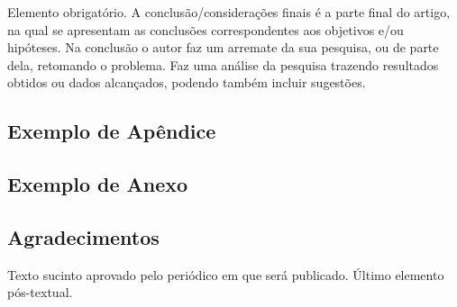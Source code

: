 \documentclass[
	article,			%
	12pt,				%
	oneside,			%
	a4paper,			%
	english,			%
	brazil,				%
	sumario=tradicional
]{abntex2}
\begin{document}
Elemento obrigatório. A conclusão/considerações finais é a parte final do artigo, na qual se apresentam as conclusões correspondentes aos objetivos e/ou hipóteses. Na conclusão o autor faz um arremate da sua pesquisa, ou de parte dela, retomando o problema. Faz uma análise da pesquisa trazendo resultados obtidos ou dados alcançados, podendo também incluir sugestões.


\postextual



%
%


\begin{apendicesenv}
   \chapter{Exemplo de Apêndice}

   \lipsum[55-56]
\end{apendicesenv}


\begin{anexosenv}
   \chapter{Exemplo de Anexo}

   \lipsum[31]
\end{anexosenv}


\section*{Agradecimentos}
Texto sucinto aprovado pelo periódico em que será publicado. Último 
elemento pós-textual.
\end{document}
